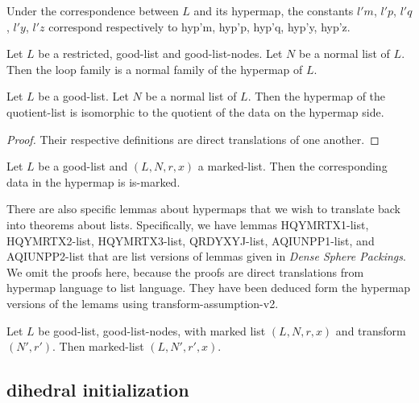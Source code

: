 \begin{lemma} 
Under the correspondence between $L$ and its hypermap, the constants
$l'm$, $l'p$, $l'q$, $l'y$, $l'z$ correspond respectively to hyp'm, hyp'p, hyp'q, hyp'y, hyp'z.
\end{lemma}

\begin{lemma} 
Let $L$ be a restricted, good-list and good-list-nodes.  Let $N$ be a normal list of $L$.
Then the loop family is a normal family of the hypermap of $L$.  
\end{lemma}

\begin{lemma} 
Let $L$ be a good-list.  Let $N$ be a normal list of $L$.
Then the hypermap of the quotient-list is isomorphic to the quotient of the data
on the hypermap side.
\end{lemma}

\begin{proof} Their respective definitions are direct translations of one another.
\end{proof}

\begin{lemma} 
 Let $L$ be a good-list and $(L,N,r,x)$ a marked-list.
Then the corresponding data in the hypermap is is-marked.
\end{lemma}

There are also specific lemmas about hypermaps that we wish to translate back into theorems
about lists.  Specifically, we have lemmas HQYMRTX1-list, HQYMRTX2-list, HQYMRTX3-list,
QRDYXYJ-list, AQIUNPP1-list, and AQIUNPP2-list that are list versions of lemmas given in {\it Dense Sphere Packings}.
We omit the proofs here, because the proofs are direct translations from hypermap language to list language.
They have been deduced form the hypermap versions of the lemams using transform-assumption-v2.

\begin{lemma} 
Let $L$ be good-list, good-list-nodes, with marked list $(L,N,r,x)$ and transform $(N',r')$.
Then marked-list $(L,N',r',x)$.
\end{lemma}


\subsection{dihedral  initialization}

